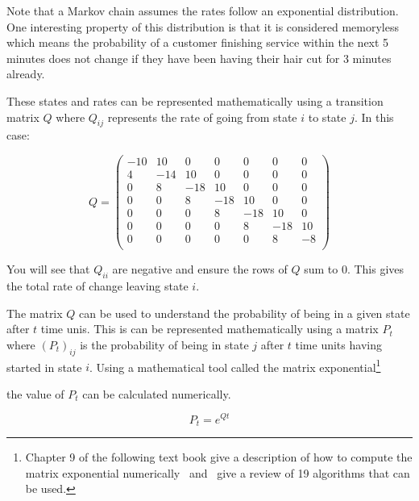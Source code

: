 Note that a Markov chain assumes the rates follow an exponential distribution.
One interesting property of this distribution is that it is considered
memoryless which means the probability of a customer finishing service
within the next 5 minutes does not change if they have been
having their hair cut for 3 minutes already.

These states and rates can be represented mathematically using a transition
matrix \(Q\) where \(Q_{ij}\) represents the rate of going from state \(i\) to
state \(j\). In this case:

\begin{equation}
Q =
\begin{pmatrix}
-10 &  10 &   0 &   0 &   0 &   0 &   0\\
  4 & -14 &  10 &   0 &   0 &   0 &   0\\
  0 &   8 & -18 &  10 &   0 &   0 &   0\\
  0 &   0 &   8 & -18 &  10 &   0 &   0\\
  0 &   0 &   0 &   8 & -18 &  10 &   0\\
  0 &   0 &   0 &   0 &   8 & -18 &  10\\
  0 &   0 &   0 &   0 &   0 &   8 &  -8\\
 \end{pmatrix}
 \label{eqn:barber_shop_transition_matrix}
\end{equation}

You will see that \(Q_{ii}\) are negative and ensure the rows of \(Q\) sum to 0.
This gives the total rate of change leaving state \(i\).

The matrix \(Q\) can be used to understand the probability of being in a given state after
\(t\) time unis. This is can be represented mathematically using a matrix
\(P_{t}\) where \((P_{t})_{ij}\) is the probability of being in state \(j\)
after \(t\) time units having started in state \(i\). Using a mathematical tool
called the matrix exponential\footnote{

Chapter 9 of the following text book give a description of how to compute the
matrix exponential numerically~\autocite{van1996matrix}
and~\autocite{moler1978nineteen, moler2003nineteen} give a review of 19
algorithms that can be used.
}

the value of \(P_{t}\) can be calculated numerically.

\begin{equation}
    P_t = e^{Qt}
    \label{eqn:continuous_time_markov_process_matrix_exponential}
\end{equation}

